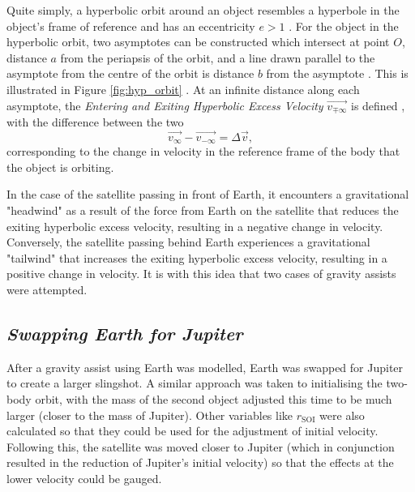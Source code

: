\documentclass[12pt, english]{report}
\begin{document}
{Quite simply, a hyperbolic orbit around an object resembles a hyperbole in the object's frame of reference and has an eccentricity $e > 1$ \cite{kluever_spaceflight_2003}. For the object in the hyperbolic orbit, two asymptotes can be constructed which intersect at point $O$, distance $a$ from the periapsis of the orbit, and a line drawn parallel to the asymptote from the centre of the orbit is distance $b$ from the asymptote . This is illustrated in Figure \ref{fig:hyp_orbit} . At an infinite distance along each asymptote, the \emph{Entering and Exiting Hyperbolic Excess Velocity} $\vec{v_{\mp \infty}}$ is defined , with the difference between the two
\begin{equation} 
    \vec{v_{\infty}} - \vec{v_{-\infty}} = \Delta \vec{v},
\end{equation}
corresponding to the change in velocity in the reference frame of the body that the object is orbiting.
}

In the case of the satellite passing in front of Earth, it encounters a gravitational "headwind" as a result of the force from Earth on the satellite that reduces the exiting hyperbolic excess velocity, resulting in a negative change in velocity. Conversely, the satellite passing behind Earth experiences a gravitational "tailwind" that increases the exiting hyperbolic excess velocity, resulting in a positive change in velocity. It is with this idea that two cases of gravity assists were attempted.

\subsection{\textsl{Swapping Earth for Jupiter}}
\normalsize{\noindent After a gravity assist using Earth was modelled, Earth was swapped for Jupiter to create a larger slingshot. A similar approach was taken to initialising the two-body orbit, with the mass of the second object adjusted this time to be much larger (closer to the mass of Jupiter). Other variables like $r_\mathrm{{SOI}}$ were also calculated so that they could be used for the adjustment of initial velocity.
Following this, the satellite was moved closer to Jupiter (which in conjunction resulted in the reduction of Jupiter's initial velocity) so that the effects at the lower velocity could be gauged.
}
\end{document}
